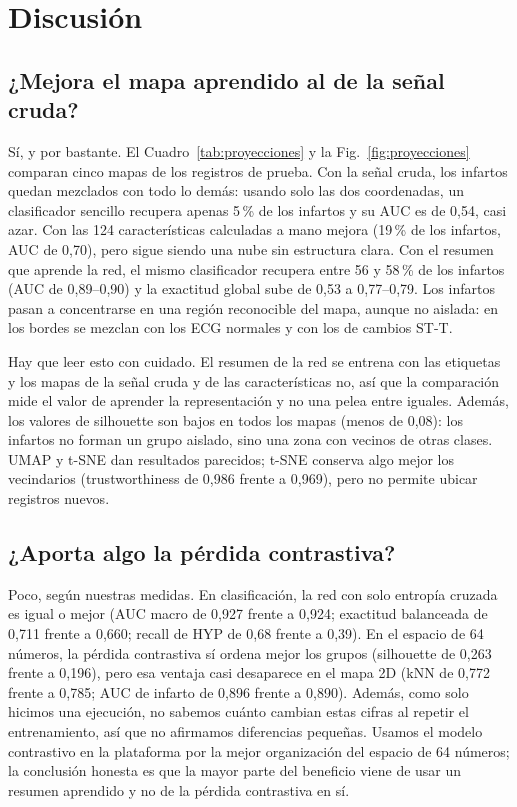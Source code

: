 \documentclass[conference]{IEEEtran}
\begin{document}
\section{Discusión}

\subsection{¿Mejora el mapa aprendido al de la señal cruda?}
Sí, y por bastante. El Cuadro~\ref{tab:proyecciones} y la Fig.~\ref{fig:proyecciones} comparan cinco mapas de los registros de prueba. Con la señal cruda, los infartos quedan mezclados con todo lo demás: usando solo las dos coordenadas, un clasificador sencillo recupera apenas 5\,\% de los infartos y su AUC es de 0,54, casi azar. Con las 124 características calculadas a mano mejora (19\,\% de los infartos, AUC de 0,70), pero sigue siendo una nube sin estructura clara. Con el resumen que aprende la red, el mismo clasificador recupera entre 56 y 58\,\% de los infartos (AUC de 0,89--0,90) y la exactitud global sube de 0,53 a 0,77--0,79. Los infartos pasan a concentrarse en una región reconocible del mapa, aunque no aislada: en los bordes se mezclan con los ECG normales y con los de cambios ST-T.

Hay que leer esto con cuidado. El resumen de la red se entrena con las etiquetas y los mapas de la señal cruda y de las características no, así que la comparación mide el valor de aprender la representación y no una pelea entre iguales. Además, los valores de silhouette son bajos en todos los mapas (menos de 0,08): los infartos no forman un grupo aislado, sino una zona con vecinos de otras clases. UMAP y t-SNE dan resultados parecidos; t-SNE conserva algo mejor los vecindarios (trustworthiness de 0,986 frente a 0,969), pero no permite ubicar registros nuevos.

\subsection{¿Aporta algo la pérdida contrastiva?}
Poco, según nuestras medidas. En clasificación, la red con solo entropía cruzada es igual o mejor (AUC macro de 0,927 frente a 0,924; exactitud balanceada de 0,711 frente a 0,660; recall de HYP de 0,68 frente a 0,39). En el espacio de 64 números, la pérdida contrastiva sí ordena mejor los grupos (silhouette de 0,263 frente a 0,196), pero esa ventaja casi desaparece en el mapa 2D (kNN de 0,772 frente a 0,785; AUC de infarto de 0,896 frente a 0,890). Además, como solo hicimos una ejecución, no sabemos cuánto cambian estas cifras al repetir el entrenamiento, así que no afirmamos diferencias pequeñas. Usamos el modelo contrastivo en la plataforma por la mejor organización del espacio de 64 números; la conclusión honesta es que la mayor parte del beneficio viene de usar un resumen aprendido y no de la pérdida contrastiva en sí.
\end{document}
